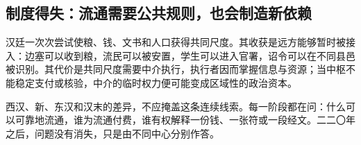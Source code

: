 \subsection{制度得失：流通需要公共规则，也会制造新依赖}

汉廷一次次尝试使粮、钱、文书和人口获得共同尺度。其收获是远方能够暂时被接入：边塞可以收到粮，流民可以被安置，学生可以进入官署，诏令可以在不同县邑被识别。其代价是共同尺度需要中介执行，执行者因而掌握信息与资源；当中枢不能稳定支付或核验，中介的临时权力便可能变成区域性的政治资本。

西汉、新、东汉和汉末的差异，不应掩盖这条连续线索。每一阶段都在问：什么可以可靠地流通，谁为流通付费，谁有权解释一份钱、一张符或一段经文。二二〇年之后，问题没有消失，只是由不同中心分别作答。
